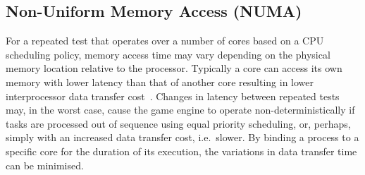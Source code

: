 







\DIFaddend \subsection{Non-Uniform Memory Access (NUMA)} \label{s:sources_numa}
For a repeated test that operates over a number of cores based on a CPU scheduling policy, memory access time may vary depending on the physical memory location relative to the processor. Typically a core can access its own memory with lower latency than that of another core resulting in lower interprocessor data transfer cost~\cite{nieplocha1996global}. 
%
Changes in latency between repeated tests may, in the worst case, cause the game engine to operate non-deterministically if tasks are processed out of sequence using equal priority scheduling, or, perhaps, simply with an increased data transfer cost, i.e.\ slower. 
%
By binding a process to a specific core for the duration of its execution, the variations in data transfer time can be minimised.






